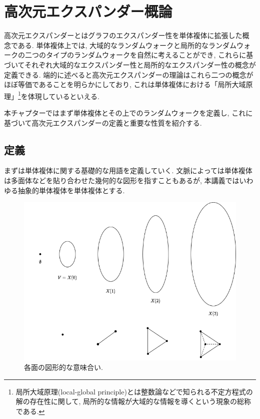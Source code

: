 \chapter{高次元エクスパンダー概論} \label{chap:HDX}
高次元エクスパンダーとはグラフのエクスパンダー性を単体複体に拡張した概念である.
単体複体上では, 大域的なランダムウォークと局所的なランダムウォークの二つのタイプのランダムウォークを自然に考えることができ, これらに基づいてそれぞれ大域的なエクスパンダー性と局所的なエクスパンダー性の概念が定義できる.
端的に述べると高次元エクスパンダーの理論はこれら二つの概念がほぼ等価であることを明らかにしており, これは単体複体における「局所大域原理」\footnote{局所大域原理(local-global principle)とは整数論などで知られる不定方程式の解の存在性に関して, 局所的な情報が大域的な情報を導くという現象の総称である.}を体現しているといえる.

本チャプターではまず単体複体とその上でのランダムウォークを定義し,
これに基づいて高次元エクスパンダーの定義と重要な性質を紹介する.

\section{定義} \label{sec:define simplicial complex}
まずは単体複体に関する基礎的な用語を定義していく.
文脈によっては単体複体は多面体などを貼り合わせた幾何的な図形を指すこともあるが,
本講義ではいわゆる抽象的単体複体を単体複体とする.
\begin{figure}
    \begin{center}
    \includegraphics[width=12cm]{images/face.png}
    \caption{各面の図形的な意味合い. \label{fig:face}}
    \end{center}
\end{figure}

